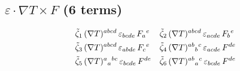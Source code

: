 \documentclass[12pt,a4paper]{article}
\newcommand{\del}{\nabla}            %
\newcommand{\eps}{\varepsilon}       %
\begin{document}
\subsection{$\eps \cdot \del T \times F$ (6 terms)}
\begin{align}
  \tilde{\zeta}_1&\, (\del T)^{abcd}\,\eps_{bcde}\,F_{a}{}^{e}  &
  \tilde{\zeta}_2&\, (\del T)^{abcd}\,\eps_{acde}\,F_{b}{}^{e}  \notag\\
  \tilde{\zeta}_3&\, (\del T)^{abcd}\,\eps_{abde}\,F_{c}{}^{e}  &
  \tilde{\zeta}_4&\, (\del T)^{ab}{}_{b}{}^{c}\,\eps_{acde}\,F^{de}  \notag\\
  \tilde{\zeta}_5&\, (\del T)^{a}{}_{a}{}^{bc}\,\eps_{bcde}\,F^{de}  &
  \tilde{\zeta}_6&\, (\del T)^{ab}{}_{a}{}^{c}\,\eps_{bcde}\,F^{de}
  \label{eq:eps_dt_f_explicit}
\end{align}
\end{document}
